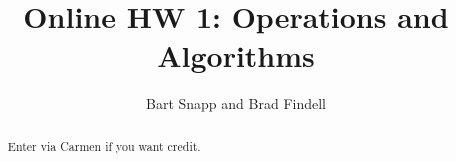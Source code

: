 \documentclass[handout,space,nooutcomes]{xourse}
\title{Online HW 1: Operations and Algorithms}
\author{Bart Snapp and Brad Findell}
\begin{document}
\begin{abstract}
Enter via Carmen if you want credit.    
\end{abstract}
\maketitle

{}
\end{document}
